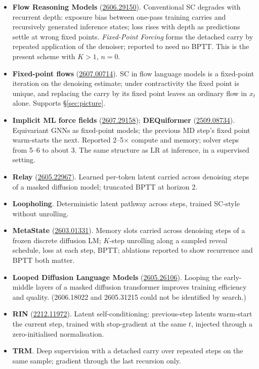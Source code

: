 \documentclass[11pt,a4paper]{article}
\begin{document}
\begin{itemize}
  \item \textbf{Flow Reasoning Models} (\href{https://arxiv.org/abs/2606.29150}{2606.29150}).
        Conventional SC degrades with recurrent depth: exposure bias between one-pass
        training carries and recursively generated inference states; loss rises with
        depth as predictions settle at wrong fixed points. \emph{Fixed-Point Forcing}
        forms the detached carry by repeated application of the denoiser; reported to
        need no BPTT. This is the present scheme with $K{>}1$, $n{=}0$.
  \item \textbf{Fixed-point flows} (\href{https://arxiv.org/abs/2607.00714}{2607.00714}).
        SC in flow language models is a fixed-point iteration on the denoising estimate;
        under contractivity the fixed point is unique, and replacing the carry by its
        fixed point leaves an ordinary flow in $x_t$ alone. Supports
        \S\ref{sec:picture}.
  \item \textbf{Implicit ML force fields} (\href{https://arxiv.org/abs/2607.29158}{2607.29158});
        \textbf{DEQuiformer} (\href{https://arxiv.org/abs/2509.08734}{2509.08734}).
        Equivariant GNNs as fixed-point models; the previous MD step's fixed point
        warm-starts the next. Reported 2--5$\times$ compute and memory; solver steps
        from 5--6 to about 3. The same structure as LR at inference, in a
        supervised setting.
  \item \textbf{Relay} (\href{https://arxiv.org/abs/2605.22967}{2605.22967}). Learned
        per-token latent carried across denoising steps of a masked diffusion model;
        truncated BPTT at horizon 2.
  \item \textbf{Loopholing}. Deterministic latent pathway across steps, trained
        SC-style without unrolling.
  \item \textbf{MetaState} (\href{https://arxiv.org/abs/2603.01331}{2603.01331}).
        Memory slots carried across denoising steps of a frozen discrete diffusion LM;
        $K$-step unrolling along a sampled reveal schedule, loss at each step, BPTT;
        ablations reported to show recurrence and BPTT both matter.
  \item \textbf{Looped Diffusion Language Models} (\href{https://arxiv.org/abs/2605.26106}{2605.26106}).
        Looping the early-middle layers of a masked diffusion transformer improves
        training efficiency and quality. (2606.18022 and 2605.31215 could not be
        identified by search.)
  \item \textbf{RIN} (\href{https://arxiv.org/abs/2212.11972}{2212.11972}). Latent
        self-conditioning: previous-step latents warm-start the current step, trained
        with stop-gradient at the same $t$, injected through a zero-initialised
        normalisation.
  \item \textbf{TRM}. Deep supervision with a detached carry over repeated steps on the
        same sample; gradient through the last recursion only.
\end{itemize}
\end{document}
